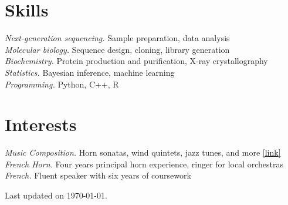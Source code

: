 \documentclass[margin,11pt]{res}
\begin{document}
\begin{resume}
\section{Skills}

\textit{Next-generation sequencing.} Sample preparation, data analysis \\
\textit{Molecular biology.} Sequence design, cloning, library generation \\
\textit{Biochemistry.} Protein production and purification, X-ray crystallography \\
\textit{Statistics.} Bayesian inference, machine learning \\
\textit{Programming.} Python, C++, R

\section{Interests}

\textit{Music Composition.} Horn sonatas, wind quintets, jazz tunes, and more \href{https://jeffjar.me/music.html}{[link]} \\
\textit{French Horn.} Four years principal horn experience, ringer for local orchestras \\
\textit{French.} Fluent speaker with six years of coursework

\end{resume}

\vfill\hfill{\scriptsize Last updated on \today.}
\end{document}
